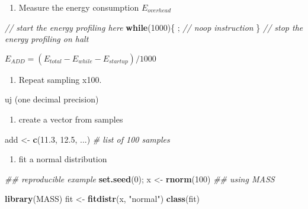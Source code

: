 \documentclass[]{article}
\newenvironment{Shaded}{\begin{snugshade}}{\end{snugshade}}
\newcommand{\CommentTok}[1]{\textcolor[rgb]{0.56,0.35,0.01}{\textit{#1}}}
\newcommand{\ControlFlowTok}[1]{\textcolor[rgb]{0.13,0.29,0.53}{\textbf{#1}}}
\newcommand{\DecValTok}[1]{\textcolor[rgb]{0.00,0.00,0.81}{#1}}
\newcommand{\FloatTok}[1]{\textcolor[rgb]{0.00,0.00,0.81}{#1}}
\newcommand{\KeywordTok}[1]{\textcolor[rgb]{0.13,0.29,0.53}{\textbf{#1}}}
\newcommand{\NormalTok}[1]{#1}
\newcommand{\StringTok}[1]{\textcolor[rgb]{0.31,0.60,0.02}{#1}}
\providecommand{\tightlist}{%
  \setlength{\itemsep}{0pt}\setlength{\parskip}{0pt}}
\begin{document}
\begin{enumerate}
\def\labelenumi{\arabic{enumi}.}
\setcounter{enumi}{1}
\tightlist
\item
  Measure the energy consumption \(E_{overhead}\)
\end{enumerate}

\begin{Shaded}
\begin{Highlighting}[]
\CommentTok{// start the energy profiling here}
\ControlFlowTok{while}\NormalTok{(}\DecValTok{1000}\NormalTok{)\{}
\NormalTok{ ; }\CommentTok{// noop instruction}
\NormalTok{\}}
\CommentTok{// stop the energy profiling on halt}
\end{Highlighting}
\end{Shaded}

\(E_{ADD} = (E_{total} - E_{while} - E_{startup}) / 1000\)

\begin{enumerate}
\def\labelenumi{\arabic{enumi}.}
\setcounter{enumi}{2}
\tightlist
\item
  Repeat sampling x100.
\end{enumerate}

uj (one decimal precision)

\begin{enumerate}
\def\labelenumi{\arabic{enumi}.}
\tightlist
\item
  create a vector from samples
\end{enumerate}

\begin{Shaded}
\begin{Highlighting}[]
\NormalTok{add <-}\StringTok{ }\KeywordTok{c}\NormalTok{(}\FloatTok{11.3}\NormalTok{, }\FloatTok{12.5}\NormalTok{, ...) }\CommentTok{# list of 100 samples}
\end{Highlighting}
\end{Shaded}

\begin{enumerate}
\def\labelenumi{\arabic{enumi}.}
\setcounter{enumi}{1}
\tightlist
\item
  fit a normal distribution
\end{enumerate}

\begin{Shaded}
\begin{Highlighting}[]
\CommentTok{## reproducible example}
\KeywordTok{set.seed}\NormalTok{(}\DecValTok{0}\NormalTok{); x <-}\StringTok{ }\KeywordTok{rnorm}\NormalTok{(}\DecValTok{100}\NormalTok{)}
\CommentTok{## using MASS}

\KeywordTok{library}\NormalTok{(MASS)}
\NormalTok{fit <-}\StringTok{ }\KeywordTok{fitdistr}\NormalTok{(x, }\StringTok{"normal"}\NormalTok{)}
\KeywordTok{class}\NormalTok{(fit)}
\end{Highlighting}
\end{Shaded}
\end{document}
